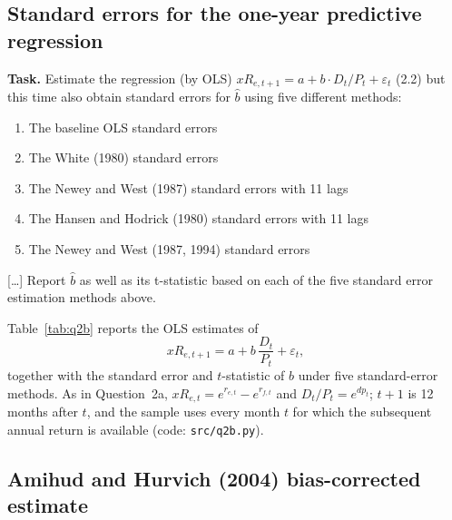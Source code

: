 \documentclass[11pt]{article}
\makeatletter
\newcommand{\dpr}{\mathit{dp}}   %
\newcommand{\xR}{\mathit{xR}}
\newcommand{\task}[1]{\par\if@nobreak\else\needspace{5\baselineskip}\fi\medskip\noindent
  \begin{minipage}{\linewidth}\textbf{Task.} #1\end{minipage}\par   %
  \nopagebreak\medskip\@afterheading}   %
\makeatother
\begin{document}
\subsection{Standard errors for the one-year predictive regression}

\task{Estimate the regression (by OLS) $\xR_{e,t+1} = a + b \cdot D_t/P_t + \varepsilon_t$ (2.2)
but this time also obtain standard errors for $\hat b$ using five different methods:
\begin{enumerate}[label=(\roman*), nosep, leftmargin=2.5em]
  \item The baseline OLS standard errors
  \item The White (1980) standard errors
  \item The Newey and West (1987) standard errors with 11 lags
  \item The Hansen and Hodrick (1980) standard errors with 11 lags
  \item The Newey and West (1987, 1994) standard errors
\end{enumerate}
[\dots] Report $\hat b$ as well as its t-statistic based on each of the five standard error
estimation methods above.}

Table~\ref{tab:q2b} reports the OLS estimates of
\begin{equation}
  \xR_{e,t+1} = a + b\,\frac{D_t}{P_t} + \varepsilon_t,
  \label{eq:q2b_regression}
\end{equation}
together with the standard error and $t$-statistic of $\hat b$ under five
standard-error methods. As in Question~2a, $\xR_{e,t} = e^{r_{e,t}} - e^{r_{f,t}}$ and
$D_t/P_t = e^{\dpr_t}$; $t+1$ is 12 months after $t$, and the sample uses every month $t$
for which the subsequent annual return is available (code: \texttt{src/q2b.py}).

\begin{table}[H]
  \centering
  
  \caption{OLS estimates of regression (\ref{eq:q2b_regression}) with the standard error
  and $t$-statistic of $\hat b$ under five standard-error methods. Predictor dates
  1927:12--2020:12. ``Lags'' is the number of autocorrelation lags; for method (v) it is
  selected by the Newey--West (1994) automatic bandwidth rule.}
  \label{tab:q2b}
\end{table}

\subsection{Amihud and Hurvich (2004) bias-corrected estimate}
\end{document}
